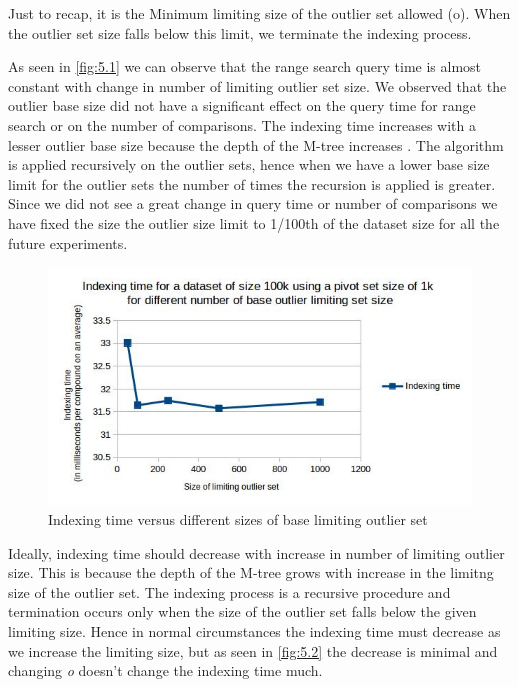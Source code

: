 Just to recap, it is the Minimum limiting size of the outlier set allowed (o). When the outlier set size falls below this limit, we terminate the indexing process.

As seen in \ref{fig:5.1} we can observe that the range search query time is almost constant with change in number of limiting outlier set size. We observed that the outlier base size did not have a significant effect on the query time for range search or on the number of comparisons. The indexing time increases with a lesser outlier base size because the depth of the M-tree increases . The algorithm is applied recursively on the outlier sets, hence when we have a lower base size limit for the outlier sets the number of times the recursion is applied is greater. Since we did not see a great change in query time or number of comparisons we have fixed the size the outlier size limit to 1/100th of the dataset size for all the future experiments.


\begin{figure}[ht!]	
\centering
\includegraphics[width=1 \columnwidth]{img/image8.jpg}
\caption{Indexing time versus different sizes of base limiting outlier set}
\label{fig:5.2}
\end{figure}


Ideally, indexing time should decrease with increase in number of limiting outlier size. This is because the depth of the M-tree grows with increase in the limitng size of the outlier set. The indexing process is a recursive procedure and termination occurs only when the size of the outlier set falls below the given limiting size. Hence in normal circumstances the indexing time must decrease as we increase the limiting size, but as seen in \autoref{fig:5.2} the decrease is minimal and changing \textit{o} doesn't change the indexing time much. 






